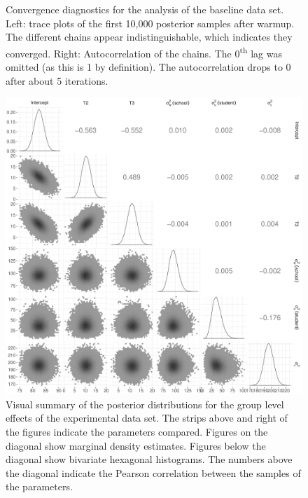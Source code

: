 \documentclass[a4paper]{article}
\begin{document}
\begin{figure}[!ht]
\begin{subfigure}{.5\textwidth}
	\end{subfigure}%
	\caption{
		Convergence diagnostics for the analysis of the baseline data set. Left: trace plots of the first 10,000 posterior samples after warmup. The different chains appear indistinguishable, which indicates they converged. Right: Autocorrelation of the chains. The 0\textsuperscript{th} lag was omitted (as this is 1 by definition). The autocorrelation drops to 0 after about 5 iterations.}
	\label{fig:baselinePosteriorDiagnostics}
\end{figure}



\begin{figure}[!ht]
	\includegraphics[width=\textwidth]{figures/productPosteriorDescriptivesPlot.pdf}
	\caption{Visual summary of the posterior distributions for the group level effects of the experimental data set. The strips above and right of the figures indicate the parameters compared. Figures on the diagonal show marginal density estimates. Figures below the diagonal show bivariate hexagonal histograms. The numbers above the diagonal indicate the Pearson correlation between the samples of the parameters.}
	\label{fig:productPosteriorDescriptives}
\end{figure}
\end{document}
